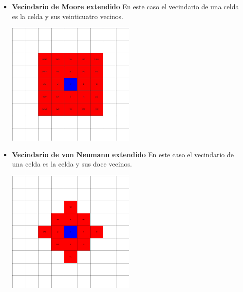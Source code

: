 \begin{itemize}
\begin{minipage}
                \label{fig:vonN}
            \end{minipage}
        \item
            \begin{minipage}
                {0.5\textwidth}
                \textbf{Vecindario de Moore extendido} En este caso el vecindario de una celda es la celda y sus veinticuatro vecinos.
            \end{minipage}
            \begin{minipage}
                {0.5\textwidth}
                \centering
                \includegraphics[width=0.5\textwidth]{./images/marco_teorico/automatas_celulares/mooreNeX.jpg}
                \label{fig:mooreNeX}
            \end{minipage}
        \item 
            \begin{minipage}
                {0.5\textwidth}
                \textbf{Vecindario de von Neumann extendido} En este caso el vecindario de una celda es la celda y sus doce vecinos.
            \end{minipage}
            \begin{minipage}
                {0.5\textwidth}
                \centering
                \includegraphics[width=0.5\textwidth]{./images/marco_teorico/automatas_celulares/vonNeX.png}

\end{minipage}
\end{itemize}
